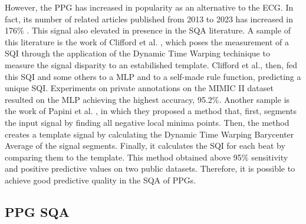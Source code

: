 However, the \gls{PPG} has increased in popularity as an alternative to the \gls{ECG}. In fact, its number of related articles published from 2013 to 2023 has increased in 176\% \cite{ppg-1}. This signal also elevated in presence in the \gls{SQA} literature. A sample of this literature is the work of Clifford et al. \cite{ppg-2}, which poses the measurement of a \gls{SQI} through the application of the Dynamic Time Warping techinique to measure the signal disparity to an estabilished template. Clifford et al., then, fed this \gls{SQI} and some others to a \gls{MLP} and to a self-made rule function, predicting a unique \gls{SQI}. Experiments on private annotations on the MIMIC II dataset resulted on the \gls{MLP} achieving the highest accuracy, 95.2\%. Another sample is the work of Papini et al. \cite{ppg-3}, in which they proposed a method that, first, segments the input signal by finding all negative local minima points. Then, the method creates a template signal by calculating the Dynamic Time Warping Barycenter Average of the signal segments. Finally, it calculates the \gls{SQI} for each beat by comparing them to the template. This method obtained above 95\% sensitivity and positive predictive values on two public datasets. Therefore, it is possible to achieve good predictive quality in the \gls{SQA} of \gls{PPG}s.      
	
\subsection{PPG SQA}
		
